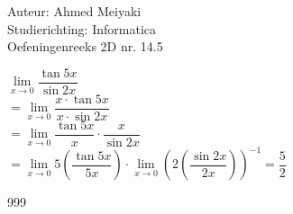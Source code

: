 \documentclass[a4paper]{article}
\begin{document}
  
\noindent \large Auteur: Ahmed Meiyaki \\
\noindent \large Studierichting: Informatica\\
\noindent \large Oefeningenreeks 2D nr. 14.5\\

\medskip

\normalsize

$\lim\limits_{x \rightarrow 0} \dfrac{\tan5x}{\sin2x} $\\

$=\lim\limits_{x \rightarrow 0} \dfrac{x \cdot \tan5x}{x \cdot \sin2x} $\\

$=\lim\limits_{x \rightarrow 0} \dfrac{\tan5x}{x} \cdot \dfrac{x}{\sin2x}  $\\

$=\lim\limits_{x \rightarrow 0} 5\left(\dfrac{\tan5x}{5x} \right) \cdot \lim\limits_{x \rightarrow 0} \left(2\left( \dfrac{\sin2x}{2x}\right) \right)^{-1} = \dfrac{5}{2} $\\




\begin{thebibliography}{999}
\end{thebibliography}
\end{document}
